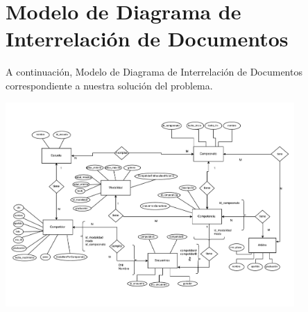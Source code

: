 \section{Modelo de Diagrama de Interrelación de Documentos}

A continuación, Modelo de Diagrama de Interrelación de Documentos correspondiente a nuestra solución del problema.\\

\begin{center}
\includegraphics[width=11cm,keepaspectratio]{./imagenes/DID.pdf}\newline
\end{center}

